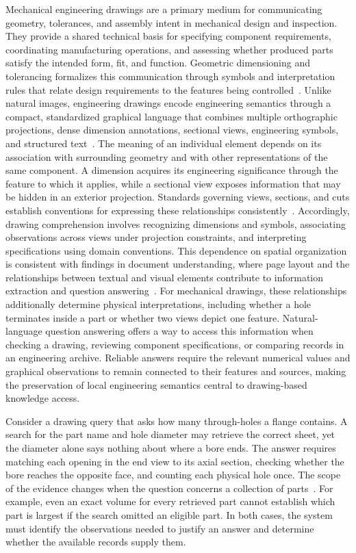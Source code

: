 \documentclass[preprint,12pt]{elsarticle}
\begin{document}
Mechanical engineering drawings are a primary medium for communicating geometry, tolerances, and assembly intent in mechanical design and inspection. They provide a shared technical basis for specifying component requirements, coordinating manufacturing operations, and assessing whether produced parts satisfy the intended form, fit, and function. Geometric dimensioning and tolerancing formalizes this communication through symbols and interpretation rules that relate design requirements to the features being controlled~\cite{asme2018y145}. Unlike natural images, engineering drawings encode engineering semantics through a compact, standardized graphical language that combines multiple orthographic projections, dense dimension annotations, sectional views, engineering symbols, and structured text~\cite{kou2026mechvqa}. The meaning of an individual element depends on its association with surrounding geometry and with other representations of the same component. A dimension acquires its engineering significance through the feature to which it applies, while a sectional view exposes information that may be hidden in an exterior projection. Standards governing views, sections, and cuts establish conventions for expressing these relationships consistently~\cite{iso2022views}. Accordingly, drawing comprehension involves recognizing dimensions and symbols, associating observations across views under projection constraints, and interpreting specifications using domain conventions. This dependence on spatial organization is consistent with findings in document understanding, where page layout and the relationships between textual and visual elements contribute to information extraction and question answering~\cite{xu2019layoutlm,mathew2020docvqa}. For mechanical drawings, these relationships additionally determine physical interpretations, including whether a hole terminates inside a part or whether two views depict one feature. Natural-language question answering offers a way to access this information when checking a drawing, reviewing component specifications, or comparing records in an engineering archive. Reliable answers require the relevant numerical values and graphical observations to remain connected to their features and sources, making the preservation of local engineering semantics central to drawing-based knowledge access.

Consider a drawing query that asks how many through-holes a flange contains. A search for the part name and hole diameter may retrieve the correct sheet, yet the diameter alone says nothing about where a bore ends. The answer requires matching each opening in the end view to its axial section, checking whether the bore reaches the opposite face, and counting each physical hole once. The scope of the evidence changes when the question concerns a collection of parts~\cite{li2025mechrag}. For example, even an exact volume for every retrieved part cannot establish which part is largest if the search omitted an eligible part. In both cases, the system must identify the observations needed to justify an answer and determine whether the available records supply them.
\end{document}
